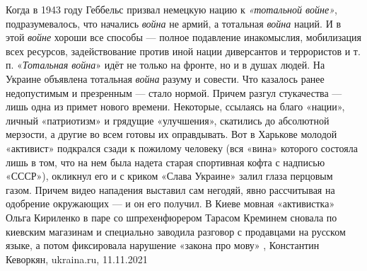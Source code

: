 Когда в 1943 году Геббельс призвал немецкую нацию к \emph{«тотальной войне»},
подразумевалось, что начались \emph{война} не армий, а тотальная \emph{война} наций. И в этой
\emph{войне} хороши все способы — полное подавление инакомыслия, мобилизация всех
ресурсов, задействование против иной нации диверсантов и террористов и т. п.
«\emph{Тотальная война}» идёт не только на фронте, но и в душах людей.  На
Украине объявлена тотальная \emph{война} разуму и совести. Что казалось ранее
недопустимым и презренным — стало нормой. Причем разгул стукачества — лишь одна
из примет нового времени. Некоторые, ссылаясь на благо «нации», личный
«патриотизм» и грядущие «улучшения», скатились до абсолютной мерзости, а другие
во всем готовы их оправдывать.  Вот в Харькове молодой «активист» подкрался
сзади к пожилому человеку (вся «вина» которого состояла лишь в том, что на нем
была надета старая спортивная кофта с надписью «СССР»), окликнул его и с криком
«Слава Украине» залил глаза перцовым газом. Причем видео нападения выставил сам
негодяй, явно рассчитывая на одобрение окружающих — и он его получил.  В Киеве
мовная «активистка» Ольга Кириленко в паре со шпрехенфюрером Тарасом Креминем
сновала по киевским магазинам и специально заводила разговор с продавцами на
русском языке, а потом фиксировала нарушение «закона про мову»
, 
Константин Кеворкян, ukraina.ru, 11.11.2021


